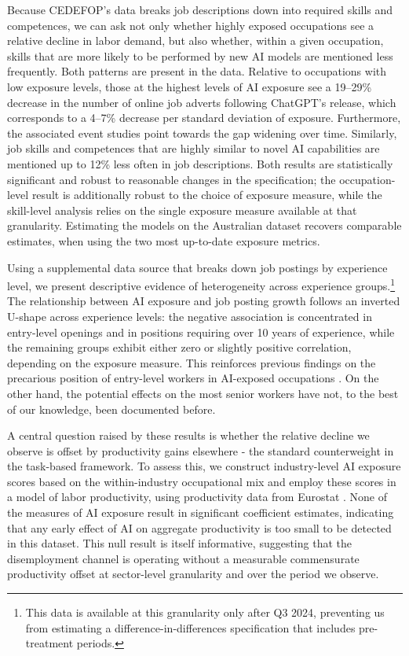 \documentclass[11pt]{article}
\begin{document}
Because CEDEFOP's data breaks job descriptions down into required skills and competences, we can ask not only whether highly exposed occupations see a relative decline in labor demand, but also whether, within a given occupation, skills that are more likely to be performed by new AI models are mentioned less frequently. Both patterns are present in the data. Relative to occupations with low exposure levels, those at the highest levels of AI exposure see a 19--29\% decrease in the number of online job adverts following ChatGPT's release, which corresponds to a 4--7\% decrease per standard deviation of exposure. Furthermore, the associated event studies point towards the gap widening over time. Similarly, job skills and competences that are highly similar to novel AI capabilities are mentioned up to 12\% less often in job descriptions. Both results are statistically significant and robust to reasonable changes in the specification; the occupation-level result is additionally robust to the choice of exposure measure, while the skill-level analysis relies on the single exposure measure available at that granularity. Estimating the models on the Australian dataset recovers comparable estimates, when using the two most up-to-date exposure metrics.

Using a supplemental data source that breaks down job postings by experience level, we present descriptive evidence of heterogeneity across experience groups.\footnote{This data is available at this granularity only after Q3 2024, preventing us from estimating a difference-in-differences specification that includes pre-treatment periods.} The relationship between AI exposure and job posting growth follows an inverted U-shape across experience levels: the negative association is concentrated in entry-level openings and in positions requiring over 10 years of experience, while the remaining groups exhibit either zero or slightly positive correlation, depending on the exposure measure. This reinforces previous findings on the precarious position of entry-level workers in AI-exposed occupations \citep{brynjolfsson2025canaries}. On the other hand, the potential effects on the most senior workers have not, to the best of our knowledge, been documented before.

A central question raised by these results is whether the relative decline we observe is offset by productivity gains elsewhere - the standard counterweight in the task-based framework. To assess this, we construct industry-level AI exposure scores based on the within-industry occupational mix and employ these scores in a model of labor productivity, using productivity data from Eurostat \citep{Eurostat_nama_10_prod_metadata}. None of the measures of AI exposure result in significant coefficient estimates, indicating that any early effect of AI on aggregate productivity is too small to be detected in this dataset. This null result is itself informative, suggesting that the disemployment channel is operating without a measurable commensurate productivity offset at sector-level granularity and over the period we observe.
\end{document}
